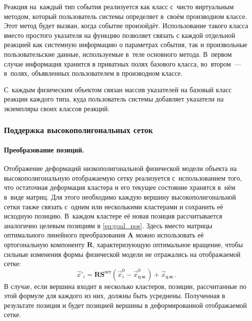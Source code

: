 \documentclass[a4paper, 14pt, titlepage]{extarticle}
\newcommand{\vect}[1]{\vec{#1}} %
\newcommand{\matx}[1]{\mathbf{#1}} %
\begin{document}
        Реакция на~каждый тип события реализуется как класс с~чисто виртуальным методом, который
        пользователь системы определяет в~своём производном классе. Этот метод будет вызван, когда
        событие произойдёт. Использование такого класса вместо простого указателя на функцию
        позволяет связать с каждой отдельной реакцией как системную информацию о параметрах события,
        так и произвольные пользовательские данные, используемые в~теле основного метода. В~первом
        случае информация хранится в приватных полях базового класса, во~втором~--- в~полях,
        объявленных пользователем в производном классе.

        С~каждым физическим объектом связан массив указателей на базовый класс реакции каждого типа,
        куда пользователь системы добавляет указатели на экземпляры своих классов реакций.

      \subsubsection{Поддержка высокополигональных сеток}\label{sssec:hi-poly}

        \paragraph{Преобразование позиций.}
        Отображение деформаций низкополигональной физической модели объекта на высокополигональную
        отображаемую сетку реализуется с~использованием того, что остаточная деформация кластера и
        его текущее состояние хранятся в~нём в~виде матриц.  Для этого необходимо каждую вершину
        высокополигональной сетки также связать с~одним или несколькими кластерами и сохранить её
        исходную позицию. В~каждом кластере её новая позиция рассчитывается аналогично целевым
        позициям в \eqref{eq:goal_pos}. Здесь вместо матрицы оптимального линейного преобразования
        $\matx A$ можно использовать её ортогональную компоненту $\matx R$, характеризующую
        оптимальное вращение, чтобы сильные изменения формы физической модели не отражались на
        отображаемой сетке:
        \begin{equation}\label{eq:graphical_pos}
          \vect{x}'_i = \matx{R} \matx{S}^{ост} (\vect{x}^0_i - \vect{x}^0_{ц.м.}) + \vect{x}_{ц.м.}.
        \end{equation}
        В случае, если вершина входит в несколько кластеров, позиции, рассчитанные по этой формуле
        для каждого из них, должны быть усреднены. Полученная в результате позиция и будет позицией
        вершины в деформированной отображаемой сетке.
\end{document}
